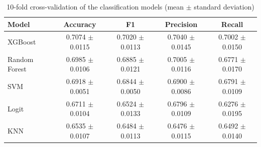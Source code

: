 \begin{table}
\caption{10-fold cross-validation of the classification models (mean $\pm$ standard deviation)}
\label{tab:cv_clasificacion}
\begin{tabular}{lcccc}
\toprule
Model & Accuracy & F1 & Precision & Recall \\
\midrule
XGBoost & 0.7074 $\pm$ 0.0115 & 0.7020 $\pm$ 0.0113 & 0.7040 $\pm$ 0.0145 & 0.7002 $\pm$ 0.0150 \\
Random Forest & 0.6985 $\pm$ 0.0106 & 0.6885 $\pm$ 0.0121 & 0.7005 $\pm$ 0.0116 & 0.6771 $\pm$ 0.0170 \\
SVM & 0.6918 $\pm$ 0.0051 & 0.6844 $\pm$ 0.0050 & 0.6900 $\pm$ 0.0086 & 0.6791 $\pm$ 0.0109 \\
Logit & 0.6711 $\pm$ 0.0104 & 0.6524 $\pm$ 0.0133 & 0.6796 $\pm$ 0.0109 & 0.6276 $\pm$ 0.0195 \\
KNN & 0.6535 $\pm$ 0.0107 & 0.6484 $\pm$ 0.0113 & 0.6476 $\pm$ 0.0115 & 0.6492 $\pm$ 0.0140 \\
\bottomrule
\end{tabular}
\end{table}
